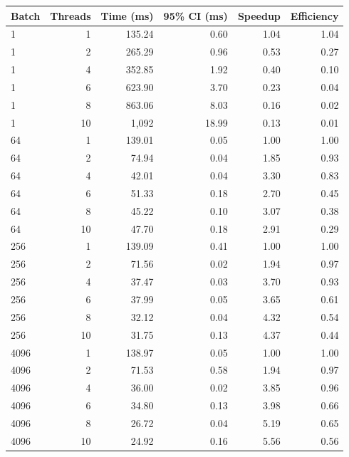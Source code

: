 \begin{tabular}{lrrrrr}
\toprule
Batch & Threads & Time (ms) & 95\% CI (ms) & Speedup & Efficiency \\
\midrule
1 & 1 & 135.24 & 0.60 & 1.04 & 1.04 \\
1 & 2 & 265.29 & 0.96 & 0.53 & 0.27 \\
1 & 4 & 352.85 & 1.92 & 0.40 & 0.10 \\
1 & 6 & 623.90 & 3.70 & 0.23 & 0.04 \\
1 & 8 & 863.06 & 8.03 & 0.16 & 0.02 \\
1 & 10 & 1,092 & 18.99 & 0.13 & 0.01 \\
64 & 1 & 139.01 & 0.05 & 1.00 & 1.00 \\
64 & 2 & 74.94 & 0.04 & 1.85 & 0.93 \\
64 & 4 & 42.01 & 0.04 & 3.30 & 0.83 \\
64 & 6 & 51.33 & 0.18 & 2.70 & 0.45 \\
64 & 8 & 45.22 & 0.10 & 3.07 & 0.38 \\
64 & 10 & 47.70 & 0.18 & 2.91 & 0.29 \\
256 & 1 & 139.09 & 0.41 & 1.00 & 1.00 \\
256 & 2 & 71.56 & 0.02 & 1.94 & 0.97 \\
256 & 4 & 37.47 & 0.03 & 3.70 & 0.93 \\
256 & 6 & 37.99 & 0.05 & 3.65 & 0.61 \\
256 & 8 & 32.12 & 0.04 & 4.32 & 0.54 \\
256 & 10 & 31.75 & 0.13 & 4.37 & 0.44 \\
4096 & 1 & 138.97 & 0.05 & 1.00 & 1.00 \\
4096 & 2 & 71.53 & 0.58 & 1.94 & 0.97 \\
4096 & 4 & 36.00 & 0.02 & 3.85 & 0.96 \\
4096 & 6 & 34.80 & 0.13 & 3.98 & 0.66 \\
4096 & 8 & 26.72 & 0.04 & 5.19 & 0.65 \\
4096 & 10 & 24.92 & 0.16 & 5.56 & 0.56 \\
\bottomrule
\end{tabular}
